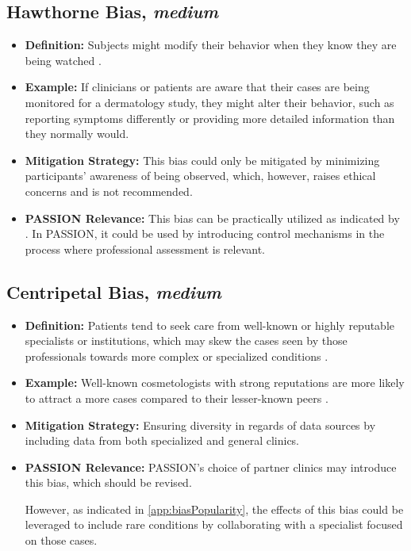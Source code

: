 \documentclass[12pt, a4paper, oneside]{book}   	%
\begin{document}
\begin{appendices}
		\subsection{Hawthorne Bias, \textit{medium}} \label{app:HawthroneBias}
		\begin{itemize}
			\item \textbf{Definition:} Subjects might modify their behavior when they know they are being watched \autocite{Chakraborty_2024}.
			\item \textbf{Example:} If clinicians or patients are aware that their cases are being monitored for a dermatology study, they might alter their behavior, such as reporting symptoms differently or providing more detailed information than they normally would.
			\item \textbf{Mitigation Strategy:} This bias could only be mitigated by minimizing participants' awareness of being observed, which, however, raises ethical concerns and is not recommended.
			\item \textbf{PASSION Relevance:} This bias can be practically utilized as indicated by \textcite{Chakraborty_2024}. In PASSION, it could be used by introducing control mechanisms in the process where professional assessment is relevant.
		\end{itemize}
		
		\subsection{Centripetal Bias, \textit{medium}}
		\begin{itemize}
			\item \textbf{Definition:} Patients tend to seek care from well-known or highly reputable specialists or institutions, which may skew the cases seen by those professionals towards more complex or specialized conditions \autocite{Chakraborty_2024}.
			\item \textbf{Example:} Well-known cosmetologists with strong reputations are more likely to attract a more cases compared to their lesser-known peers \autocite{Chakraborty_2024}.
			\item \textbf{Mitigation Strategy:} Ensuring diversity in regards of data sources by including data from both specialized and general clinics.
			\item \textbf{PASSION Relevance:} PASSION's choice of partner clinics may introduce this bias, which should be revised.
			
			However, as indicated in \autoref{app:biasPopularity}, the effects of this bias could be leveraged to include rare conditions by collaborating with a specialist focused on those cases.
		\end{itemize}
		

\end{appendices}
\end{document}
